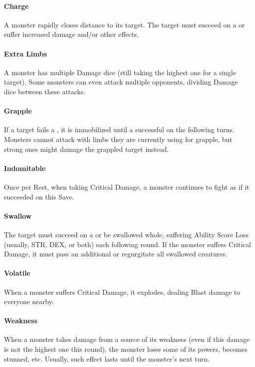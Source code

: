 \documentclass[itdr]{subfiles}
\begin{document}
\paragraph{Charge}
A monster rapidly closes distance to its target. The target must succeed on a  or suffer increased damage and/or other effects.

\paragraph{Extra Limbs}
A monster has multiple Damage dice (still taking the highest one for a single target). Some monsters can even attack multiple opponents, dividing Damage dice between these attacks.

\paragraph{Grapple}
If a target fails a , it is immobilized until a successful  on the following turns. Monsters cannot attack with limbs they are currently using for grapple, but strong ones might damage the grappled target instead.

\paragraph{Indomitable}
Once per Rest, when taking Critical Damage, a monster continues to fight as if it succeeded on this Save.

\paragraph{Swallow}
The target must succeed on a  or be swallowed whole, suffering Ability Score Loss (usually, STR, DEX, or both) each following round. If the monster suffers Critical Damage, it must pass an additional  or regurgitate all swallowed creatures.

\paragraph{Volatile}
When a monster suffers Critical Damage, it explodes, dealing Blast damage to everyone nearby.

\paragraph{Weakness}
When a monster takes damage from a source of its weakness (even if this damage is not the highest one this round), the monster loses some of its powers, becomes stunned, etc. Usually, such effect lasts until the monster's next turn.
\end{document}
